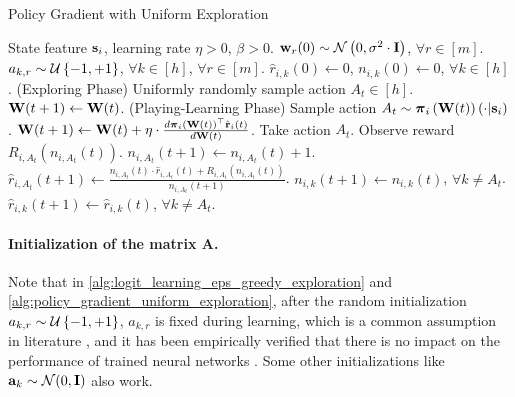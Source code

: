 \begin{algorithm}[t]
   \caption{Policy Gradient with Uniform Exploration}
\label{alg:policy_gradient_uniform_exploration}
\begin{algorithmic}
    State feature ${\mathbf{s}}_i$, learning rate $\eta > 0$, $\beta > 0$.
   \STATE ${\mathbf{w}}_r(0) \sim {\mathcal{N}}\left( 0, \sigma^2 \cdot {\mathbf{I}} \right)$, $\forall r \in [m]$.
   \STATE $a_{k, r} \sim {\mathcal{U}}\left\{-1, +1\right\}$, $\forall k \in [h]$, $\forall r \in [m]$.
   \STATE $\hat{r}_{i,k}\left(0\right) \gets 0$, $n_{i,k}\left(0\right) \gets 0$, $\forall k \in [h]$.
   \STATE (Exploring Phase)
   \STATE Uniformly randomly sample action $A_{t} \in [h]$.
   \STATE ${\mathbf{W}}(t+1) \leftarrow {\mathbf{W}}(t)$.
   \ELSE
   \STATE (Playing-Learning Phase)
   \STATE Sample action $A_{t} \sim {\boldsymbol{\pi}}_{i}\left({\mathbf{W}}(t)\right)\left(\cdot \middle| {\mathbf{s}}_i \right)$.
   \STATE ${\mathbf{W}}(t+1) \leftarrow {\mathbf{W}}(t) + \eta \cdot \frac{d {\boldsymbol{\pi}}_{i}\left({\mathbf{W}}(t)\right)^\top \hat{{\mathbf{r}}}_i \left(t\right)}{d {\mathbf{W}}(t)}$.
   \ENDIF
   \STATE Take action $A_{t}$. Observe reward $R_{i, A_{t}}\left(n_{i, A_{t}}\left(t\right) \right)$.
   \STATE $n_{i, A_{t}}\left(t+1\right) \gets n_{i, A_{t}}\left(t\right) + 1$.
   \STATE $\hat{r}_{i,A_{t}}\left(t+1\right) \gets \frac{n_{i, A_{t}}\left(t\right) \cdot \hat{r}_{i,A_{t}}\left(t\right) + R_{i, A_{t}}\left(n_{i, A_{t}}\left(t\right)\right) }{n_{i, A_{t}}\left(t+1\right)}$.
   \STATE $n_{i, k}\left(t+1\right) \gets n_{i, k}\left(t\right)$, $\forall k \not= A_t$.
   \STATE $\hat{r}_{i,k}\left(t+1\right) \gets \hat{r}_{i,k}\left(t\right)$, $\forall k \not= A_t$.
   \ENDFOR
\end{algorithmic}
\end{algorithm}

\paragraph{Initialization of the matrix $\mathbf{A}$.} Note that in \cref{alg:logit_learning_eps_greedy_exploration} and \cref{alg:policy_gradient_uniform_exploration}, after the random initialization $a_{k,r} \sim {\mathcal{U}}\left\{-1, +1\right\}$, $a_{k,r}$ is fixed during learning, which is a common assumption in literature \citep{li2018learning,du2018gradientA,du2018gradientB,allen2018convergenceA,allen2018convergenceB}, and it has been empirically verified that there is no impact on the performance of trained neural networks \citep{hoffer2018fix}. Some other initializations like ${\mathbf{a}}_k \sim {\mathcal{N}}(0, {\mathbf{I}})$ also work.
